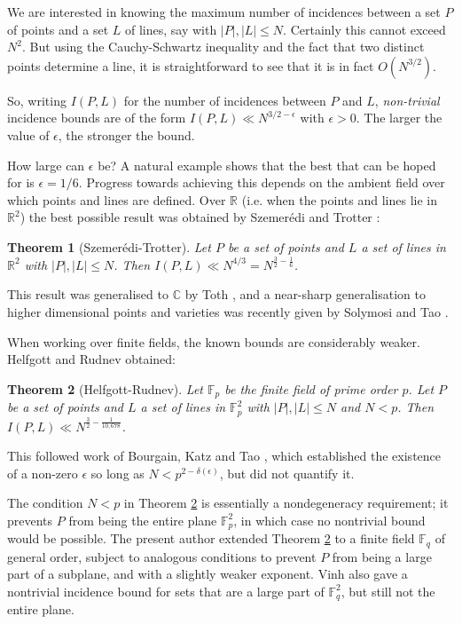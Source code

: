 \documentclass[12pt]{article}
\newtheorem{theorem}{Theorem}
\begin{document}
We are interested in knowing the maximum number of incidences between a set $P$ of points and a set $L$ of lines, say with $|P|,|L|\leq N$. Certainly this cannot exceed $N^2$. But using the Cauchy-Schwartz inequality and the fact that two distinct points determine a line, it is straightforward to see that it is in fact $O(N^{3/2})$. 

So, writing $I(P,L)$ for the number of incidences between $P$ and $L$, \textit{non-trivial} incidence bounds are of the form $I(P,L)\ll N^{3/2-\epsilon}$ with $\epsilon>0$. The larger the value of $\epsilon$, the stronger the bound. 

How large can $\epsilon$ be? A natural example shows that the best that can be hoped for is $\epsilon = 1/6$. Progress towards achieving this depends on the ambient field over which points and lines are defined. Over $\mathbb{R}$ (i.e. when the points and lines lie in $\mathbb{R}^2$) the best possible result was obtained by Szemer\'edi and Trotter \cite{ST}:

\begin{theorem}[Szemer\'edi-Trotter]\label{theorem:ST}
Let $P$ be a set of points and $L$ a set of lines in $\mathbb{R}^2$ with $|P|,|L|\leq N$. Then $I(P,L)\ll N^{4/3}=N^{\frac{3}{2}-\frac{1}{6}}$.
\end{theorem}

This result was generalised to $\mathbb{C}$ by Toth \cite{toth}, and a near-sharp generalisation to higher dimensional points and varieties was recently given by Solymosi and Tao \cite{solymositao}.

When working over finite fields, the known bounds are considerably weaker. Helfgott and Rudnev \cite{HR} obtained:

\begin{theorem}[Helfgott-Rudnev] \label{theorem:HR}
Let $\mathbb{F}_p$ be the finite field of prime order $p$. Let $P$ be a set of points and $L$ a set of lines in $\mathbb{F}_p^2$ with $|P|,|L|\leq N$ and $N<p$. Then $I(P,L)\ll N^{\frac{3}{2}-\frac{1}{10,678}}$. 
\end{theorem}

This followed work of Bourgain, Katz and Tao \cite{BKT}, which established the existence of a non-zero $\epsilon$ so long as $N<p^{2-\delta(\epsilon)}$, but did not quantify it.

The condition $N<p$ in Theorem \ref{theorem:HR} is essentially a nondegeneracy requirement; it prevents $P$ from being the entire plane $\mathbb{F}_p^2$, in which case no nontrivial bound would be possible. The present author \cite{me1} extended Theorem \ref{theorem:HR} to a finite field $\mathbb{F}_q$ of general order, subject to analogous conditions to prevent $P$ from being a large part of a subplane, and with a slightly weaker exponent. Vinh \cite{vinh} also gave a nontrivial incidence bound for sets that are a large part of $\mathbb{F}_q^2$, but still not the entire plane.
\end{document}
